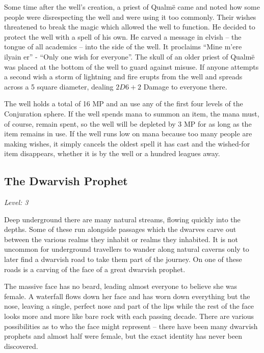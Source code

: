 \begin{multicols}{2}
Some time after the well's creation, a priest of Qualm\"{e} came and noted how some people were disrespecting the well and were using it too commonly.
Their wishes threatened to break the magic which allowed the well to function.
He decided to protect the well with a spell of his own.
He carved a message in elvish -- the tongue of all academics -- into the side of the well.
It proclaims ``Mine m'{e}re ilyain er'' - ``Only one wish for everyone''.
The skull of an older priest of Qualm\"{e} was placed at the bottom of the well to guard against misuse.
If anyone attempts a second wish a storm of lightning and fire erupts from the well and spreads across a 5 square diameter, dealing $2D6+2$ Damage to everyone there.

The well holds a total of 16 MP and an use any of the first four levels of the Conjuration sphere.
If the well spends mana to summon an item, the mana must, of course, remain spent, so the well will be depleted by 3 MP for as long as the item remains in use.
If the well runs low on mana because too many people are making wishes, it simply cancels the oldest spell it has cast and the wished-for item disappears, whether it is by the well or a hundred leagues away.

\subsection{The Dwarvish Prophet}

\textit{Level: 3}

\noindent Deep underground there are many natural streams, flowing quickly into the depths.  Some of these run alongside passages which the dwarves carve out between the various realms they inhabit or realms they inhabited.  It is not uncommon for underground travellers to wander along natural caverns only to later find a dwarvish road to take them part of the journey.  On one of these roads is a carving of the face of a great dwarvish prophet.

\begin{boxtext}

	The massive face has no beard, leading almost everyone to believe she was female.
	A waterfall flows down her face and has worn down everything but the nose, leaving a single, perfect nose and part of the lips while the rest of the face looks more and more like bare rock with each passing decade.
	There are various possibilities as to who the face might represent -- there have been many dwarvish prophets and almost half were female, but the exact identity has never been discovered.


\end{boxtext}
\end{multicols}
